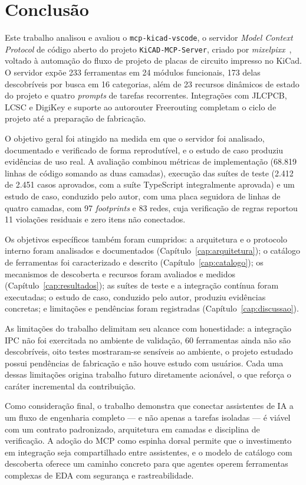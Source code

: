 \chapter{Conclusão}\label{cap:conclusao}

Este trabalho analisou e avaliou o \texttt{mcp-kicad-vscode}, o servidor
\emph{Model Context Protocol} de código aberto do projeto
\texttt{KiCAD-MCP-Server}, criado por \emph{mixelpixx}~\citep{kicadmcpserver},
voltado à automação do fluxo de projeto de placas de circuito impresso no
KiCad. O servidor expõe 233
ferramentas em 24 módulos funcionais, 173 delas descobríveis por busca em 16
categorias, além de 23 recursos dinâmicos de estado do projeto e quatro
\emph{prompts} de tarefas recorrentes. Integrações com JLCPCB, LCSC e DigiKey
e suporte ao autorouter Freerouting completam o ciclo de projeto até a
preparação de fabricação.

O objetivo geral foi atingido na medida em que o servidor foi analisado,
documentado e verificado de forma reprodutível, e o estudo de caso produziu
evidências de uso real. A avaliação combinou métricas
de implementação (68.819 linhas de código somando as duas camadas), execução
das suítes de teste (2.412 de 2.451 casos aprovados, com a suíte TypeScript
integralmente aprovada) e um estudo de caso, conduzido pelo autor, com uma
placa seguidora
de linhas de quatro camadas, com 97 \emph{footprints} e 83 redes, cuja
verificação de regras reportou 11 violações residuais e zero itens não
conectados.

Os objetivos específicos também foram cumpridos: a arquitetura e o protocolo
interno foram analisados e documentados (Capítulo~\ref{cap:arquitetura}); o
catálogo de ferramentas foi caracterizado e descrito
(Capítulo~\ref{cap:catalogo}); os mecanismos de descoberta e recursos foram
avaliados e medidos (Capítulo~\ref{cap:resultados}); as suítes de teste e a
integração contínua foram executadas; o estudo de caso, conduzido pelo autor,
produziu evidências concretas; e limitações e pendências foram registradas
(Capítulo~\ref{cap:discussao}).

As limitações do trabalho delimitam seu alcance com honestidade: a integração
IPC não foi exercitada no ambiente de validação, 60 ferramentas ainda não são
descobríveis, oito testes mostraram-se sensíveis ao ambiente, o projeto
estudado possui pendências de fabricação e não houve estudo com usuários. Cada
uma dessas limitações origina trabalho futuro diretamente acionável, o que
reforça o caráter incremental da contribuição.

Como consideração final, o trabalho demonstra que conectar assistentes de IA
a um fluxo de engenharia completo --- e não apenas a tarefas isoladas --- é
viável com um contrato padronizado, arquitetura em camadas e disciplina de
verificação. A adoção do MCP como espinha dorsal permite que o investimento
em integração seja compartilhado entre assistentes, e o modelo de catálogo
com descoberta oferece um caminho concreto para que agentes operem
ferramentas complexas de EDA com segurança e rastreabilidade.
